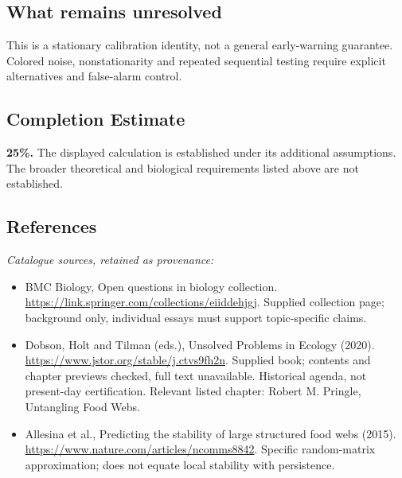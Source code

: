 \documentclass[11pt]{article}
\begin{document}
\subsection{What remains unresolved}
This is a stationary calibration identity, not a general early-warning guarantee. Colored noise, nonstationarity and repeated sequential testing require explicit alternatives and false-alarm control.
\subsection{Completion Estimate}
\textbf{25\%.} The displayed calculation is established under its additional assumptions. The broader theoretical and biological requirements listed above are not established.
\subsection{References}
\noindent\emph{Catalogue sources, retained as provenance:}
\begin{itemize}
\item BMC Biology, Open questions in biology collection. \url{https://link.springer.com/collections/eiiddehjgj}. Supplied collection page; background only, individual essays must support topic-specific claims.
\item Dobson, Holt and Tilman (eds.), Unsolved Problems in Ecology (2020). \url{https://www.jstor.org/stable/j.ctvs9fh2n}. Supplied book; contents and chapter previews checked, full text unavailable. Historical agenda, not present-day certification. Relevant listed chapter: Robert M. Pringle, Untangling Food Webs.
\item Allesina et al., Predicting the stability of large structured food webs (2015). \url{https://www.nature.com/articles/ncomms8842}. Specific random-matrix approximation; does not equate local stability with persistence.
\end{itemize}
\end{document}
